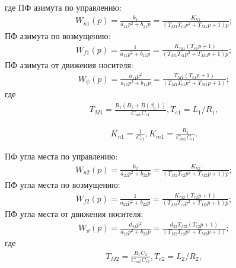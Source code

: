 где
ПФ азимута по управлению:
\begin{equation}
\label{eq:p4:s3.4}
\begin{multlined}
W_{n1}(p) = \frac{k_{1}}{a_{11}p^{2}+b_{11}p} = \frac{K_{n1}}{(T_{M1} T_{e1} p^2 + T_{M1} p +1)p};
\end{multlined}
\end{equation}
ПФ азимута по возмущению:
\begin{equation}
\label{eq:p4:s3.5}
\begin{multlined}
W_{f1}(p) = \frac{1}{a_{11}p^{2}+b_{11}p} =  \frac{K_{m1} (T_{e1} p +1)}{(T_{M1} T_{e1} p^2 + T_{M1} p +1)p};
\end{multlined}
\end{equation}
ПФ азимута от движения носителя:
\begin{equation}
\label{eq:p4:s3.6}
\begin{multlined}
W_{\psi}(p) = \frac{a_{11} p^2}{a_{11}p^{2}+b_{11}p} =  \frac{T_{M1}(T_{e1} p +1)}{(T_{M1} T_{e1} p^2 + T_{M1} p +1)};
\end{multlined}
\end{equation}
где 
\begin{equation}
\label{eq:p4:tt1}
\begin{aligned}
T_{M1} =\frac{R_1 (B_1 + B(\beta_0))}{C_{m1}C_{e1}},
T_{e1} = L_1/R_1,
\end{aligned}
\end{equation}

\begin{equation}
\label{eq:p4:kk1}
\begin{aligned}
K_{n1}=\frac{1}{C_{e1}},
K_{m1}= \frac{R_1}{C_{m1}C_{e1}}.
\end{aligned}
\end{equation}

ПФ угла места по управлению:
\begin{equation}
\label{eq:p4:s3.7}
\begin{multlined}
W_{n2}(p) = \frac{k_{2}}{a_{22}p^{2}+b_{22}p} = \frac{K_{n2}}{(T_{M2} T_{e2} p^2 + T_{M2} p +1)p};
\end{multlined}
\end{equation}
ПФ угла места по возмущению:
\begin{equation}
\label{eq:p4:s3.8}
\begin{multlined}
W_{f2}(p) = \frac{1}{a_{22}p^{2}+b_{22}p} =  \frac{K_{m2}(T_{e2} p + 1)}{(T_{M2} T_{e2} p^2 + T_{M2} p +1)p};
\end{multlined}
\end{equation}
ПФ угла места от движения носителя:
\begin{equation}
\label{eq:p4:s3.9}
\begin{multlined}
W_{\vartheta}(p) = \frac{d_{23} p^2}{a_{22}p^{2}+b_{22}p} = 
\frac{d_{23} T_{M2}(T_{e2} p + 1)}{(T_{M2} T_{e2} p^2 + T_{M2} p +1)};
\end{multlined}
\end{equation}
где 
\begin{equation}
\label{eq:p4:tt2}
\begin{aligned}
T_{M2} =\frac{R_1 C_2}{C_{m2}C_{e2}},
T_{e2} = L_2/R_2,
\end{aligned}
\end{equation}

